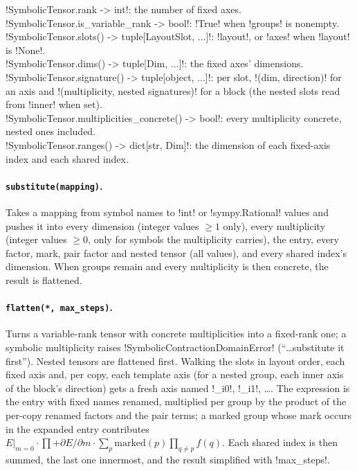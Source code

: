 \begin{signature}
\py!SymbolicTensor.rank -> int!: the number of fixed axes.\\
\py!SymbolicTensor.is_variable_rank -> bool!: \py!True! when \py!groups! is nonempty.\\
\py!SymbolicTensor.slots() -> tuple[LayoutSlot, ...]!: \py!layout!, or \py!axes! when \py!layout! is \py!None!.\\
\py!SymbolicTensor.dims() -> tuple[Dim, ...]!: the fixed axes' dimensions.\\
\py!SymbolicTensor.signature() -> tuple[object, ...]!: per slot, \py!(dim, direction)! for an axis and \py!(multiplicity, nested signatures)! for a block (the nested slots read from \py!inner! when set).\\
\py!SymbolicTensor.multiplicities_concrete() -> bool!: every multiplicity concrete, nested ones included.\\
\py!SymbolicTensor.ranges() -> dict[str, Dim]!: the dimension of each fixed-axis index and each shared index.
\end{signature}

\paragraph{\texttt{substitute(mapping)}.} Takes a mapping from symbol names to \py!int! or \py!sympy.Rational! values and pushes it into every dimension (integer values $\ge1$ only), every multiplicity (integer values $\ge0$, only for symbols the multiplicity carries), the entry, every factor, mark, pair factor and nested tensor (all values), and every shared index's dimension. When groups remain and every multiplicity is then concrete, the result is flattened.

\paragraph{\texttt{flatten(*, max\_steps)}.} Turns a variable-rank tensor with concrete multiplicities into a fixed-rank one; a symbolic multiplicity raises \py!SymbolicContractionDomainError! (``\ldots substitute it first''). Nested tensors are flattened first. Walking the slots in layout order, each fixed axis and, per copy, each template axis (for a nested group, each inner axis of the block's direction) gets a fresh axis named \code!_i0!, \code!_i1!, \ldots. The expression is the entry with fixed names renamed, multiplied per group by the product of the per-copy renamed factors and the pair terms; a marked group whose mark occurs in the expanded entry contributes $E|_{m=0}\cdot\prod+\partial E/\partial m\cdot\sum_p \text{marked}(p)\prod_{q\ne p}f(q)$. Each shared index is then summed, the last one innermost, and the result simplified with \py!max_steps!.

